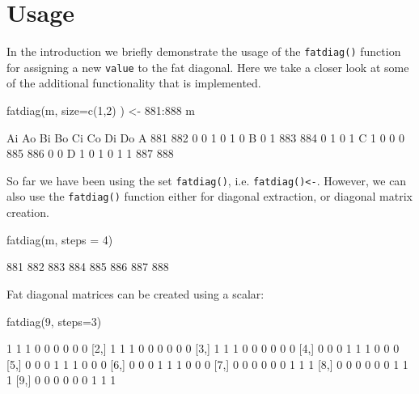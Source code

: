 \documentclass[article]{jss}
\begin{document}
\section{Usage}\label{usage}

In the introduction we briefly demonstrate the usage of the
\texttt{fatdiag()} function for assigning a new \texttt{value} to the
fat diagonal. Here we take a closer look at some of the additional
functionality that is implemented.

\begin{CodeChunk}
\begin{CodeInput}
fatdiag(m, size=c(1,2) ) <- 881:888
m
\end{CodeInput}
\begin{CodeOutput}
   Ai  Ao  Bi  Bo  Ci  Co  Di  Do
A 881 882   0   0   1   0   1   0
B   0   1 883 884   0   1   0   1
C   1   0   0   0 885 886   0   0
D   1   0   1   0   1   1 887 888
\end{CodeOutput}
\end{CodeChunk}

So far we have been using the set \texttt{fatdiag()}, i.e.
\texttt{fatdiag()\textless{}-}. However, we can also use the
\texttt{fatdiag()} function either for diagonal extraction, or diagonal
matrix creation.

\begin{CodeChunk}
\begin{CodeInput}
fatdiag(m, steps = 4)
\end{CodeInput}
\begin{CodeOutput}
[1] 881 882 883 884 885 886 887 888
\end{CodeOutput}
\end{CodeChunk}

Fat diagonal matrices can be created using a scalar:

\begin{CodeChunk}
\begin{CodeInput}
fatdiag(9, steps=3)
\end{CodeInput}
\begin{CodeOutput}
      [,1] [,2] [,3] [,4] [,5] [,6] [,7] [,8] [,9]
 [1,]    1    1    1    0    0    0    0    0    0
 [2,]    1    1    1    0    0    0    0    0    0
 [3,]    1    1    1    0    0    0    0    0    0
 [4,]    0    0    0    1    1    1    0    0    0
 [5,]    0    0    0    1    1    1    0    0    0
 [6,]    0    0    0    1    1    1    0    0    0
 [7,]    0    0    0    0    0    0    1    1    1
 [8,]    0    0    0    0    0    0    1    1    1
 [9,]    0    0    0    0    0    0    1    1    1
\end{CodeOutput}
\end{CodeChunk}
\end{document}
